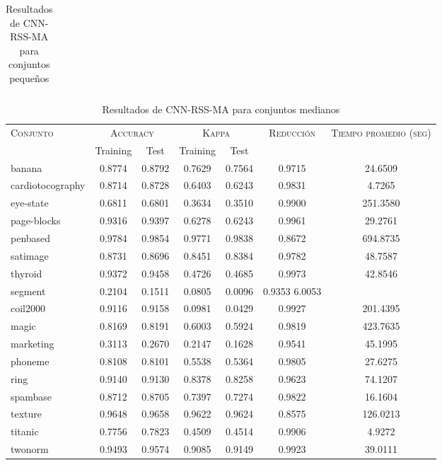 \begin{table}[]
\begin{tabular}{l c c c c c c}
\hline
\end{tabular}
\caption{Resultados de CNN-RSS-MA para conjuntos pequeños }
\label{res-peq-CNN-RSS-MA}
\end{table}


\begin{table}[]
\centering
\begin{tabular}{l c c c c c c}
\hline
\multirow{2}{*}{\textsc{Conjunto}}
	& \multicolumn{2}{c}{\textsc{Accuracy}}
	& \multicolumn{2}{c}{\textsc{Kappa}}
	& \textsc{Reducción}
	& \textsc{Tiempo promedio (seg)} \\
	& Training & Test
	& Training & Test \\ 
\hline
\hline

banana & 0.8774 & 0.8792 & 0.7629 & 0.7564 & 0.9715 & 24.6509 \\
cardiotocography & 0.8714 & 0.8728 & 0.6403 & 0.6243 & 0.9831 & 4.7265 \\
eye-state & 0.6811 & 0.6801 & 0.3634 & 0.3510 & 0.9900 &  251.3580 \\
page-blocks & 0.9316 & 0.9397 & 0.6278 & 0.6243 & 0.9961 & 29.2761 \\
penbased & 0.9784 & 0.9854 & 0.9771 & 0.9838 & 0.8672 &  694.8735 \\
satimage & 0.8731 & 0.8696 & 0.8451 & 0.8384 & 0.9782 & 48.7587 \\
thyroid & 0.9372 & 0.9458 & 0.4726 & 0.4685 & 0.9973 & 42.8546 \\
segment & 0.2104 & 0.1511 & 0.0805 & 0.0096 & 0.9353  6.0053 \\
coil2000 & 0.9116 & 0.9158 & 0.0981 & 0.0429 & 0.9927 &  201.4395 \\
magic & 0.8169 & 0.8191 & 0.6003 & 0.5924 & 0.9819 &  423.7635 \\
marketing & 0.3113 & 0.2670 & 0.2147 & 0.1628 & 0.9541 & 45.1995 \\
phoneme & 0.8108 & 0.8101 & 0.5538 & 0.5364 & 0.9805 & 27.6275 \\
ring & 0.9140 & 0.9130 & 0.8378 & 0.8258 & 0.9623 & 74.1207 \\
spambase & 0.8712 & 0.8705 & 0.7397 & 0.7274 & 0.9822 & 16.1604 \\
texture & 0.9648 & 0.9658 & 0.9622 & 0.9624 & 0.8575 & 126.0213 \\
titanic & 0.7756 & 0.7823 & 0.4509 & 0.4514 & 0.9906 & 4.9272 \\
twonorm & 0.9493 & 0.9574 & 0.9085 & 0.9149 & 0.9923 & 39.0111 \\

\hline
\end{tabular}
\caption{Resultados de CNN-RSS-MA para conjuntos medianos }
\label{res-med-CNN-RSS-MA}
\end{table}

